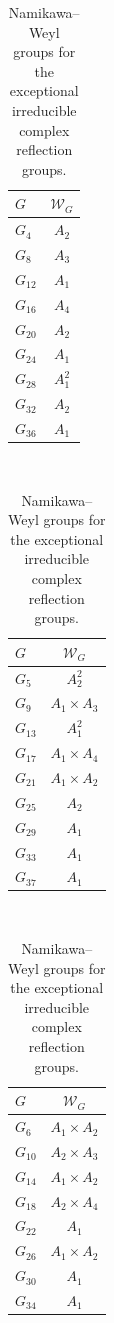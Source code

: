\documentclass[a4paper]{amsart}
\theoremstyle{plain}
\theoremstyle{definition}
\theoremstyle{remark}
\begin{document}
\begin{table}[h]
  \caption{Namikawa--Weyl groups for the exceptional irreducible complex reflection groups.}
  \label{tab:compexcep}
  \begin{tabular}{|l|c|}
    \(G\)      &  \(\mathcal W_G\) \\
    \hline
    \(G_4\)    & \(A_2\)   \\
    \(G_8\)    & \(A_3\)   \\
    \(G_{12}\) & \(A_1\)   \\
    \(G_{16}\) & \(A_4\)   \\
    \(G_{20}\) & \(A_2\)   \\
    \(G_{24}\) & \(A_1\)   \\
    \(G_{28}\) & \(A_1^2\) \\
    \(G_{32}\) & \(A_2\)   \\
    \(G_{36}\) & \(A_1\)
  \end{tabular}~
  \begin{tabular}{|l|c|}
    \(G\)      &  \(\mathcal W_G\) \\
    \hline
    \(G_5\)    & \(A_2^2\)                  \\
    \(G_9\)    & \(A_1\times A_3\) \\
    \(G_{13}\) & \(A_1^2\)                  \\
    \(G_{17}\) & \(A_1\times A_4\) \\
    \(G_{21}\) & \(A_1\times A_2\) \\
    \(G_{25}\) & \(A_2\)                    \\
    \(G_{29}\) & \(A_1\)                    \\
    \(G_{33}\) & \(A_1\)                    \\
    \(G_{37}\) & \(A_1\)
  \end{tabular}~
  \begin{tabular}{|l|c|}
    \(G\)      & \(\mathcal W_G\) \\
    \hline
    \(G_6\)    & \(A_1\times A_2\) \\
    \(G_{10}\) & \(A_2\times A_3\) \\
    \(G_{14}\) & \(A_1\times A_2\) \\
    \(G_{18}\) & \(A_2\times A_4\) \\
    \(G_{22}\) & \(A_1\)                    \\
    \(G_{26}\) & \(A_1\times A_2\) \\
    \(G_{30}\) & \(A_1\)                    \\
    \(G_{34}\) & \(A_1\)                    \\

\end{tabular}
\end{table}
\end{document}

